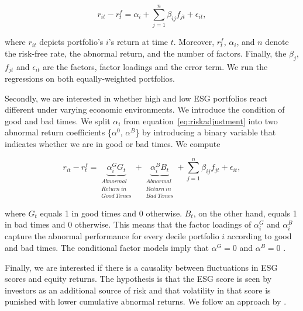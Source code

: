 \documentclass[11pt]{article}
\begin{document}
\begin{equation}
\label{eq:riskadjustment}
r_{it} - r_t^f = \alpha_i + \sum_{j=1}^{n} \beta_{ij} f_{jt} + \epsilon_{it},
\end{equation}

where $r_{it}$ depicts portfolio's $i$'s return at time $t$. Moreover, $r_t^f$, $\alpha_i$, and $n$ denote the risk-free rate, the abnormal return, and the number of factors. Finally, the $\beta_{j}$, $f_{jt}$ and $\epsilon_{it}$ are the factors, factor loadings and the error term. We run the regressions on both equally-weighted portfolios.

Secondly, we are interested in whether high and low ESG portfolios react different under varying economic environments. We introduce the condition of good and bad times. We split $\alpha_i$ from equation~\eqref{eq:riskadjustment} into two abnormal return coefficients \{$\alpha^0$, $\alpha^B$\} by introducing a binary variable that indicates whether we are in good or bad times. We compute 

\begin{equation}
\label{eq:goodandbadtimes}
r_{it} - r_t^f = 
	\underbrace{\alpha_i^{G} G_t}_{\substack{Abnormal\\Return~in\\Good~Times}} + 
	\underbrace{\alpha_i^{B} B_t}_{\substack{Abnormal\\Return~in\\Bad~Times}}  
	+ \sum_{j=1}^{n} \beta_{ij} f_{jt} + \epsilon_{it},
\end{equation}

where $G_t$ equals 1 in good times and 0 otherwise. $B_t$, on the other hand, equals 1 in bad times and 0 otherwise. This means that the factor loadings of $\alpha_i^{G}$ and $\alpha_i^{B}$ capture the abnormal performance for every decile portfolio $i$ according to good and bad times. The conditional factor models imply that $\alpha^G = 0$ and $\alpha^B = 0$ \citep[see, for example,][for similar applications]{Ferson2009, Christopherson1998}.



Finally, we are interested if there is a causality between fluctuations in ESG scores and equity returns. The hypothesis is that the ESG score is seen by investors as an additional source of risk and that volatility in that score is punished with lower cumulative abnormal returns. We follow an approach by \citet{Campbell1997}.
\end{document}
